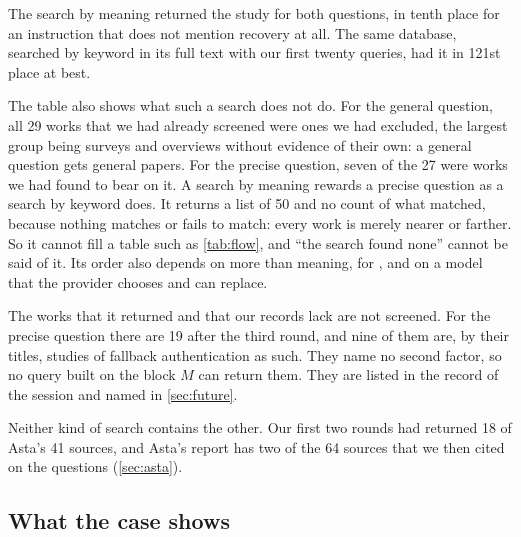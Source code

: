 The search by meaning returned the study for both questions, in tenth
place for an instruction that does not mention recovery at all.
The same database, searched by keyword in its full text with our first
twenty queries, had it in 121st place at best.

The table also shows what such a search does not do.
For the general question, all 29 works that we had already screened
were ones we had excluded, the largest group being surveys and
overviews without evidence of their own: a general question gets
general papers.
For the precise question, seven of the 27 were works we had found to
bear on it.
A search by meaning rewards a precise question as a search by keyword
does.
It returns a list of 50 and no count of what matched, because nothing
matches or fails to match: every work is merely nearer or farther.
So it cannot fill a table such as \cref{tab:flow}, and
\enquote{the search found none} cannot be said of it.
Its order also depends on more than meaning, for
, and on a model that the provider chooses and can replace.

The works that it returned and that our records lack are not screened.
For the precise question there are 19 after the third round, and nine
of them are, by their titles, studies of fallback authentication as
such.
They name no second factor, so no query built on the block $M$ can
return them.
They are listed in the record of the session and named in
\cref{sec:future}.

Neither kind of search contains the other.
Our first two rounds had returned 18 of Asta's 41 sources, and Asta's
report has two of the 64 sources that we then cited on the questions
(\cref{sec:asta}).

\subsection{What the case shows}

